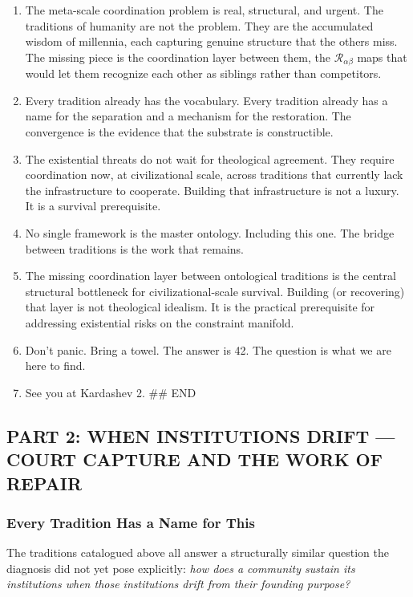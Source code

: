 \documentclass[
]{article}
\begin{document}
\begin{enumerate}
\def\labelenumi{\arabic{enumi}.}
\setcounter{enumi}{264}
\item
  The meta-scale coordination problem is real, structural, and urgent.
  The traditions of humanity are not the problem. They are the
  accumulated wisdom of millennia, each capturing genuine structure that
  the others miss. The missing piece is the coordination layer between
  them, the \(\mathcal{R}_{\alpha\beta}\) maps that would let them
  recognize each other as siblings rather than competitors.
\item
  Every tradition already has the vocabulary. Every tradition already
  has a name for the separation and a mechanism for the restoration. The
  convergence is the evidence that the substrate is constructible.
\item
  The existential threats do not wait for theological agreement. They
  require coordination now, at civilizational scale, across traditions
  that currently lack the infrastructure to cooperate. Building that
  infrastructure is not a luxury. It is a survival prerequisite.
\item
  No single framework is the master ontology. Including this one. The
  bridge between traditions is the work that remains.
\item
  The missing coordination layer between ontological traditions is the
  central structural bottleneck for civilizational-scale survival.
  Building (or recovering) that layer is not theological idealism. It is
  the practical prerequisite for addressing existential risks on the
  constraint manifold.
\item
  Don't panic. Bring a towel. The answer is 42. The question is what we
  are here to find.
\item
  See you at Kardashev 2. \#\# END
\end{enumerate}

\subsection{PART 2: WHEN INSTITUTIONS DRIFT --- COURT CAPTURE AND
THE WORK OF REPAIR}\label{part-2-when-institutions-drift}

\subsubsection{Every Tradition Has a Name for
This}\label{every-tradition-has-a-name-for-this}

The traditions catalogued above all answer a structurally similar
question the diagnosis did not yet pose explicitly: \emph{how does
a community sustain its institutions when those institutions drift
from their founding purpose?}
\end{document}
